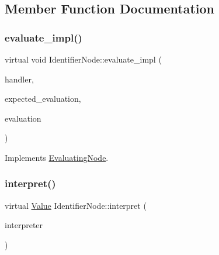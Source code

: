\subsection{Member Function Documentation}
\mbox{\label{classIdentifierNode_a4960a1e68623066e413f8c2d68cee7e5}} 
\subsubsection{\texorpdfstring{evaluate\+\_\+impl()}{evaluate\_impl()}}
{\footnotesize\ttfamily virtual void Identifier\+Node\+::evaluate\+\_\+impl (\begin{DoxyParamCaption}\item[{\hyperlink{classSystemHandler}{System\+Handler} $\ast$}]{handler,  }\item[{\hyperlink{statics_8h_a6664c451ca7787483a7981cc1de68dbb}{E\+V\+A\+L\+U\+A\+T\+I\+O\+N\+\_\+\+T\+Y\+PE}}]{expected\+\_\+evaluation,  }\item[{struct \hyperlink{structEvaluation}{Evaluation} $\ast$}]{evaluation }\end{DoxyParamCaption})\hspace{0.3cm}{\ttfamily [virtual]}}



Implements \hyperlink{classEvaluatingNode_a085fa06e0b46a93c814dc55cda0c1b26}{Evaluating\+Node}.

\mbox{\label{classIdentifierNode_aa7be7da3e018352f8b549fcac3a8155a}} 
\subsubsection{\texorpdfstring{interpret()}{interpret()}}
{\footnotesize\ttfamily virtual \hyperlink{classValue}{Value} Identifier\+Node\+::interpret (\begin{DoxyParamCaption}\item[{\hyperlink{classInterpreter}{Interpreter} $\ast$}]{interpreter }\end{DoxyParamCaption})\hspace{0.3cm}{\ttfamily [virtual]}}



